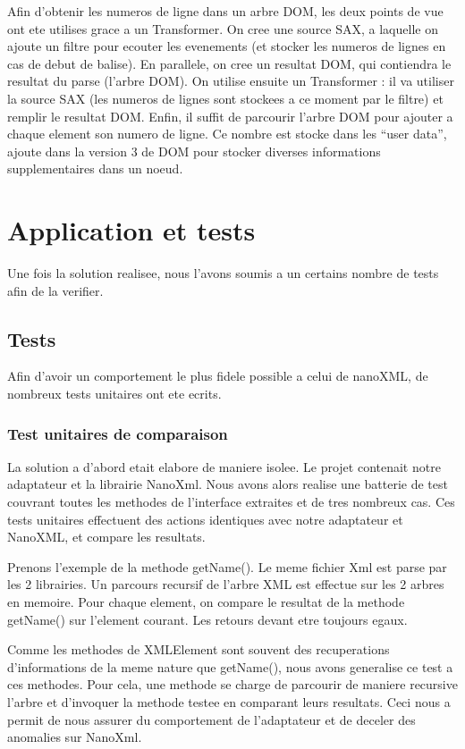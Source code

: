 Afin d'obtenir les numeros de ligne dans un arbre DOM, les deux points de vue ont ete utilises grace a un Transformer.
On cree une source SAX, a laquelle on ajoute un filtre pour ecouter les evenements (et stocker les numeros de lignes en cas de debut de balise).
En parallele, on cree un resultat DOM, qui contiendra le resultat du parse (l'arbre DOM).
On utilise ensuite un Transformer : il va utiliser la source SAX (les numeros de lignes sont stockees a ce moment par le filtre) et remplir le resultat DOM.
Enfin, il suffit de parcourir l'arbre DOM pour ajouter a chaque element son numero de ligne.
Ce nombre est stocke dans les ``user data'', ajoute dans la version 3  de DOM pour stocker diverses informations supplementaires dans un noeud.
\section{Application et tests}
Une fois la solution realisee, nous l'avons soumis a un certains nombre de tests afin de la verifier.
\subsection{Tests}
Afin d'avoir un comportement le plus fidele possible a celui de nanoXML, de nombreux tests unitaires ont ete ecrits.
\subsubsection{Test unitaires de comparaison}
La solution a d'abord etait elabore de maniere isolee. Le projet contenait notre adaptateur et la librairie NanoXml. Nous avons alors realise une batterie de test couvrant toutes les methodes de l'interface extraites et de tres nombreux cas. Ces tests unitaires effectuent des actions identiques avec notre adaptateur et NanoXML, et compare les resultats. 

Prenons l'exemple de la methode getName(). Le meme fichier Xml est parse par les 2 librairies. Un parcours recursif de l'arbre XML est effectue sur les 2 arbres en memoire. Pour chaque element, on compare le resultat de la methode getName() sur l'element courant. Les retours devant etre toujours egaux.

Comme les methodes de XMLElement sont souvent des recuperations d'informations de la meme nature que getName(), nous avons generalise ce test a ces methodes. Pour cela, une methode se charge de parcourir de maniere recursive l'arbre et d'invoquer la methode testee en comparant leurs resultats. Ceci nous a permit de nous assurer du comportement de l'adaptateur et de deceler des anomalies sur NanoXml.

